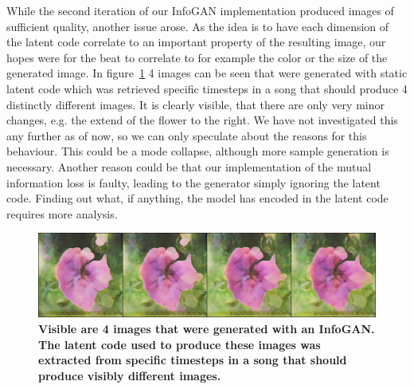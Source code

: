         While the second iteration of our InfoGAN implementation produced images of sufficient quality, another issue arose. As the idea is to have each dimension of the latent code correlate to an important property of the resulting image, our hopes were for the beat to correlate to for example the color or the size of the generated image. In figure~\ref{fig:infogan_res_2} 4 images can be seen that were generated with static latent code which was retrieved specific timesteps in a song that should produce 4 distinctly different images. It is clearly visible, that there are only very minor changes, e.g. the extend of the flower to the right. We have not investigated this any further as of now, so we can only speculate about the reasons for this behaviour. This could be a mode collapse, although more sample generation is necessary. Another reason could be that our implementation of the mutual information loss is faulty, leading to the generator simply ignoring the latent code. Finding out what, if anything, the model has encoded in the latent code requires more analysis.
        
        \begin{figure}[h]
            \centering
            \includegraphics[width=.94\textwidth]{images/fixed_160}
            \caption[Images generated from InfoGan.]
            {
                \textbf{Visible are 4 images that were generated with an InfoGAN. The latent code used to produce these images was extracted from specific timesteps in a song that should produce visibly different images.}
            }
            \label{fig:infogan_res_2}
        \end{figure}